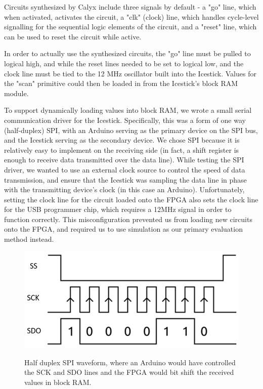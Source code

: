 \documentclass[12pt]{article}
\begin{document}
Circuits synthesized by Calyx include three signals by default - a "go" line, which when activated,
activates the circuit, a "clk" (clock) line, which handles cycle-level signalling for the sequential logic
elements of the circuit, and a "reset" line, which can be used to reset the circuit while active.

In order to actually use the synthesized circuits, the "go" line must be pulled to logical high, and
while the reset lines needed to be set to logical low, and the clock line must be tied to the 12 MHz
oscillator built into the Icestick. Values for the "scan" primitive could then be loaded in from the Icestick's
block RAM module.

To support dynamically loading values into block RAM, we wrote a small serial communication driver for the Icestick.
Specifically, this was a form of one way (half-duplex) SPI, with an Arduino serving as the primary device on the SPI
bus, and the Icestick serving as the secondary device. We chose SPI because it is relatively easy to implement
on the receiving side (in fact, a shift register is enough to receive data transmitted over the data line).
While testing the SPI driver, we wanted to use an external clock source to control the speed of data transmission,
and ensure that the Icestick was sampling the data line in phase with the transmitting device's clock (in this case
an Arduino). Unfortunately, setting the clock line for the circuit loaded onto the FPGA also sets the clock line
for the USB programmer chip, which requires a 12MHz signal in order to function correctly. This misconfiguration
prevented us from loading new circuits onto the FPGA, and required us to use simulation as our primary evaluation
method instead.
\begin{figure}[H]
\includegraphics{images/spi.png}
\caption{Half duplex SPI waveform, where an Arduino would have controlled the SCK and SDO lines and the FPGA would bit shift
the received values in block RAM.}
\cite{mathworks_support_nodate}
\end{figure}
\end{document}
